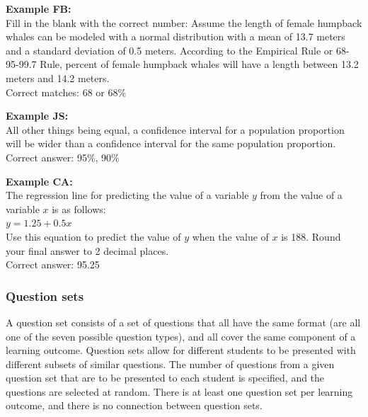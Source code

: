 \documentclass{article}\usepackage[]{graphicx}\usepackage[]{color}
\numberwithin{equation}{section} %
\begin{document}
\begin{framed}
\textbf{Example FB:}\\

Fill in the blank with the correct number: Assume the length of female humpback whales can be modeled with a normal distribution with a mean of 13.7 meters and a standard deviation of 0.5 meters. According to the Empirical Rule or 68-95-99.7 Rule, \underline{\hspace{2cm}} percent of female humpback whales will have a length between 13.2 meters and 14.2 meters.\\

Correct matches: 68 or 68\%
\end{framed}

\begin{framed}
\textbf{Example JS:}\\

All other things being equal, a \underline{\hspace{2cm}} confidence interval for a population proportion will be wider than a \underline{\hspace{2cm}} confidence interval for the same population proportion.\\

Correct answer: 95\%, 90\%
\end{framed}

\begin{framed}
\textbf{Example CA:}\\

The regression line for predicting the value of a variable $y$ from the value of a variable $x$ is as follows:\\

$y = 1.25 + 0.5x$\\

Use this equation to predict the value of $y$ when the value of $x$ is 188. Round your final answer to 2 decimal places.\\

Correct answer: 95.25
\end{framed}

\subsubsection{Question sets}

A question set consists of a set of questions that all have the same format (are all one of the seven possible question types), and all cover the same component of a learning outcome. Question sets allow for different students to be presented with different subsets of similar questions. The number of questions from a given question set that are to be presented to each student is specified, and the questions are selected at random. There is at least one question set per learning outcome, and there is no connection between question sets.
\end{document}
